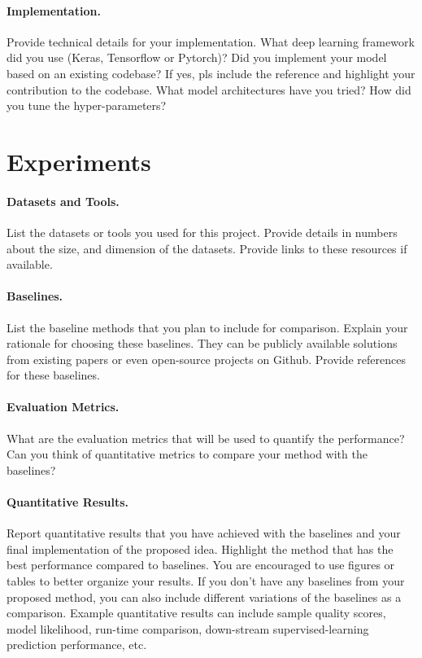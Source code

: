 \documentclass{article}
\newcommand{\new}[1]{{\color{red} #1}}
\begin{document}
\paragraph{Implementation.}
Provide technical details for your implementation. What deep learning framework did you use (Keras, Tensorflow or Pytorch)? Did you implement your model based on an existing codebase? If yes, pls include the reference and highlight your contribution to the codebase. What model architectures have you tried? How did you tune the hyper-parameters?


\section{Experiments}
\paragraph{Datasets and Tools.}
List the datasets or tools  you used for this project. {\color{red}{Only describe the datasets that you have used in the experiments.}} Provide details in numbers about the size, and dimension of the datasets. Provide links to these resources if available.

\paragraph{Baselines.}
List the  baseline methods  that you plan to include for comparison. Explain your rationale for choosing these baselines. They can be publicly available solutions from existing papers or even open-source projects on Github. Provide references for these baselines. 
{
\color{red}{
\begin{itemize}
    \item Baseline 1 [reference]: 1-2 sentences summary of the baseline.
    \item Baseline 2 [reference]:1-2 sentences summary of the baseline.
    \item $\dots$
\end{itemize}
}
}

\paragraph{Evaluation Metrics.}
What are the evaluation metrics that will be used to quantify the performance? Can you think of quantitative metrics to compare your method with the baselines? 

\paragraph{Quantitative Results.}
Report  quantitative results that you have achieved with the baselines and your \new{final} implementation of the proposed idea. Highlight the method that has the best performance \new{compared to baselines}. You are encouraged to use figures or tables to better organize  your results. If you don't have any baselines from your proposed method, you can also include different variations of the baselines as a comparison. \new{Example quantitative results can include sample quality scores, model likelihood, run-time comparison, down-stream supervised-learning prediction performance, etc.}
\end{document}
